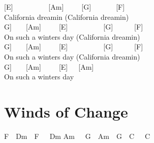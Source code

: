 \documentclass[
  letterpaper,
  a5paper]{memoir}
\begin{document}
{[}E{]}~~~~~~~~~~{[}Am{]}~~~~~{[}G{]}~~~~~~~{[}F{]}\\
California dreamin (California dreamin\textquotesingle)\\
\hspace*{0.333em}\hspace*{0.333em}{[}G{]}~~~~{[}Am{]}~~~~~{[}E{]}~~~~~~~~~~{[}G{]}~~~~~~{[}F{]}\\
On such a winter\textquotesingle s day (California
dreamin\textquotesingle)\\
\hspace*{0.333em}\hspace*{0.333em}{[}G{]}~~~~{[}Am{]}~~~~~{[}E{]}~~~~~~~~~~{[}G{]}~~~~~~{[}F{]}\\
On such a winter\textquotesingle s day (California
dreamin\textquotesingle)\\
\hspace*{0.333em}\hspace*{0.333em}{[}G{]}~~~~{[}Am{]}~~~~~{[}E{]}~~~{[}Am{]}\\
On such a winter\textquotesingle s day

\hypertarget{winds-of-change}{%
\chapter{Winds of Change}\label{winds-of-change}}

F~~Dm~~F~~~Dm Am~~~G~~Am~~G~~C~~~C
\end{document}
